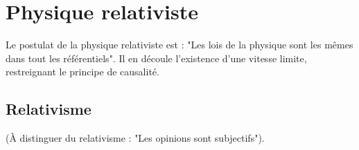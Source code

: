 
\section{Physique relativiste}

Le postulat de la physique relativiste est : "Les lois de la physique sont les mêmes dans tout les référentiels".
Il en découle l'existence d'une vitesse limite, restreignant le principe de causalité. 



\subsection{Relativisme}
(À distinguer du relativisme : "Les opinions sont subjectifs").



